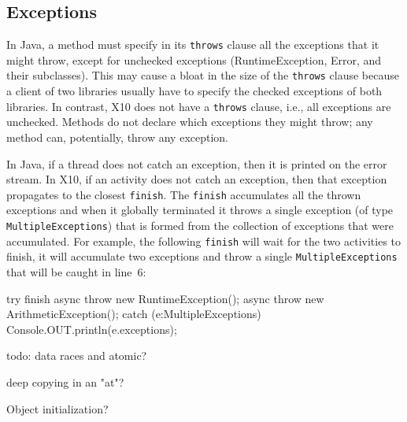 \documentclass[a4paper]{article}
\def\codesmaller{\small}
\newcommand{\code}[1]{\texttt{\textup{\codesmaller #1}}}
\begin{document}
\subsection{Exceptions}
In Java, a method must specify in its \code{throws} clause all the exceptions that it might throw,
    except for unchecked exceptions (RuntimeException, Error, and their subclasses).
This may cause a bloat in the size of the \code{throws} clause because a client of two libraries usually have to
    specify the checked exceptions of both libraries.
In contrast, X10 does not have a \code{throws} clause, i.e.,  all exceptions are unchecked.
Methods do not declare which exceptions they might throw; any method can, potentially, throw any exception.

In Java, if a thread does not catch an exception, then it is printed on the error stream.
In X10, if an activity does not catch an exception, then that exception propagates to the closest \code{finish}.
The \code{finish} accumulates all the thrown exceptions and when it globally terminated it throws
    a single exception (of type \code{MultipleExceptions}) that is formed from the collection of exceptions that were accumulated.
For example, the following \code{finish} will wait for the two activities to finish,
    it will accumulate two exceptions and throw a single \code{MultipleExceptions}
    that will be caught in line~6:
\begin{xten}
try {
  finish {
    async { throw new RuntimeException(); }
    async { throw new ArithmeticException(); }
  }
} catch (e:MultipleExceptions) {
  Console.OUT.println(e.exceptions);
}
\end{xten}

 todo: data races and atomic?

 deep copying in an "at"?

Object initialization?


\end{document}
